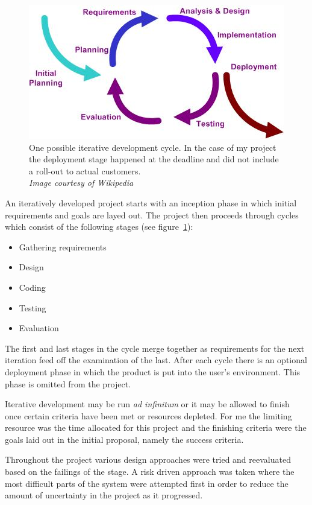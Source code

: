 \documentclass[12pt,a4paper,twoside]{scrbook}
\begin{document}
\begin{figure}
  \centering
  \includegraphics{./figs/Iterative_development_model_V2.jpg}
  \caption{One possible iterative development cycle. In the case of my project
    the deployment stage happened at the deadline and did not include a roll-out
    to actual customers. \\ \emph{Image courtesy of Wikipedia}}
  \label{fig:iterative}
\end{figure}

An iteratively developed project starts with an inception phase in which initial
requirements and goals are layed out. The project then proceeds through cycles
which consist of the following stages (see figure~\ref{fig:iterative}):

\begin{itemize}
\item
  Gathering requirements
\item
  Design
\item
  Coding
\item
  Testing
\item
  Evaluation
\end{itemize}

The first and last stages in the cycle merge together as requirements for the
next iteration feed off the examination of the last. After each cycle there is an
optional deployment phase in which the product is put into the user's
environment. This phase is omitted from the project.

Iterative development may be run \emph{ad infinitum} or it may be allowed to
finish once certain criteria have been met or resources depleted. For me the
limiting resource was the time allocated for this project and the finishing
criteria were the goals laid out in the initial proposal, namely the success
criteria.

Throughout the project various design approaches were tried and reevaluated
based on the failings of the stage. A risk driven approach was taken where the most
difficult parts of the system were attempted first in order to reduce the amount
of uncertainty in the project as it progressed.
\end{document}
